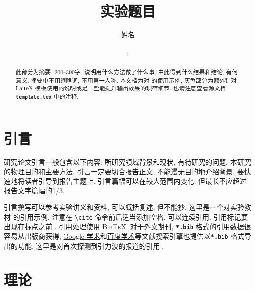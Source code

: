\documentclass[font=default]{mpltx}
\makeatletter
\newcommand{\note}[1]{{\color{gray}#1}}
\newcommand*\cs[1]{\texttt{\textbackslash #1}}
\newcommand*\file[1]{\textbf{\texttt{#1}}}
\newcommand\releasedate{%
    \href{https://github.com/CastleStar14654/PKUMpLtX/releases/tag/\mpltx@fileversion}%
        {\mpltx@filedate, \mpltx@fileversion}}
\makeatother
\begin{document}
\title{实验题目} %
\author{姓名} %
\date{\releasedate}
\begin{abstract}
  此部分为摘要.
  200--300字, 说明用什么方法做了什么事, 由此得到什么结果和结论, 有何意义.
  摘要中不用缩略词, 不用第一人称.
  \note{本文档为对 \href{https://github.com/CastleStar14654/PKUMpLtX}{\pkg*{PKUMpLtX}} 的使用示例, 灰色部分为额外针对 \LaTeX{} 模板使用的说明或是一些能提升输出效果的琐碎细节.
    也请注意查看源文档 \file{template.tex} 中的注释.}
\end{abstract}

\maketitle

\section{引言}

研究论文引言一般包含以下内容:
所研究领域背景和现状,
有待研究的问题,
本研究的物理目的和主要方法.
引言一定要切合报告正文, 不能漫无目的地介绍背景, 要快速地将读者引导到报告主题上.
引言篇幅可以在较大范围内变化, 但最长不应超过报告文字篇幅的1/3.

引言撰写可以参考实验讲义和资料, 可以概括复述, 但不能抄.
\note{这里是一个对实验教材 \cite{jindaishiyan} 的引用示例.}
\note{注意在 \cs{cite} 命令前后适当添加空格.
  可以连续引用.
  引用标记要出现在标点之前 \cite{GBT7714,pr}.
  引用处理使用 \textsc{Bib\TeX};
  对于外文期刊, \file{*.bib} 格式的引用数据很容易从出版商获得;
  \href{https://scholar.google.com}{Google 学术}和\href{https://xueshu.baidu.com}{百度学术}等文献搜索引擎也提供以\file{*.bib} 格式导出的功能.
  这里是对首次探测到引力波的报道的引用 \cite{PhysRevLett.116.061102}.}

\section{理论}\label{sec:theory}
\end{document}
